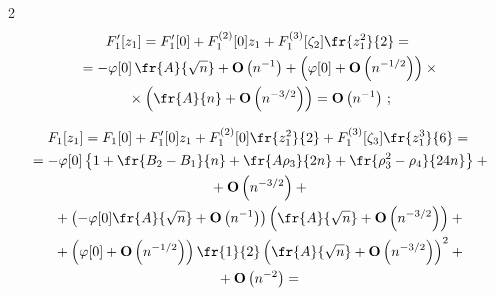 \begin{multicols}{2}
\begin{multline}
 F_1'[z_{1}]= F_1'[0]+F_1^{(2)}[0] z_{1}+F_1^{(3)}[\zeta_2] \fr{z^2_{1}}{2}={}


\\


  {}=-\varphi[0]\,\fr{A}{\sqrt{n}}+\mathbf{O}\left(n^{-1}\right)


  +\left(\varphi[0]+\mathbf{O}\left(n^{-1/2}\right)\right)\times{}\\


  {}\times


  \left(\fr{A}{n}+\mathbf{O}\left(n^{-3/2}\right)\right)=


  \mathbf{O}\left(n^{-1}\right)\,;


 \label{e46-ch}


 \end{multline}


 


 \vspace*{-12pt}


 


 \noindent


 \begin{multline}


 F_1[z_{1}]=F_1[0]+ F'_1[0] z_{1}+F_1^{(2)}[0] \fr{z_{1}^2}{2}


 +F_1^{(3)}[\zeta_3] \fr{z_{1}^3}{6}={}


\\


 {}=-\varphi[0]\left\{ 1+\fr{B_2-B_1}{n}+\fr{A\rho_3}{2n}


 +\fr{\rho_3^2-\rho_4  }{24n} \right\}


 +{}\\


 {}+\mathbf{O}\left(n^{-3/2}\right)+{}


\\


{} +\left(-\varphi[0]\fr{A}{\sqrt{n}}+\mathbf{O}\left(n^{-1}\right)\right)


 \left(\fr{A}{\sqrt{n}}+\mathbf{O}\left(n^{-3/2}\right)\right)+{}


 \\


{} +\left(\varphi[0]+\mathbf{O}\left(n^{-1/2}\right)\right)


 \fr{1}{2}\left(\fr{A}{\sqrt{n}}+\mathbf{O}\left(n^{-3/2}\right)\right)^2


 +{}\\


 {}+\mathbf{O}\left(n^{-2}\right)={}



\end{multline}
\end{multicols}
